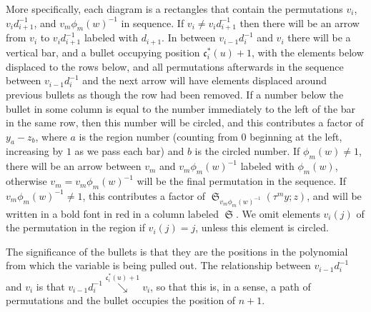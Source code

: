 \documentclass[reqno]{amsart}
\theoremstyle{definition}
\theoremstyle{remark}
\numberwithin{equation}{subsection}
\DeclareMathOperator{\sch}{\mathfrak{S}}
\newcommand{\downvar}[1]{\stackrel{#1}{\searrow}}
\newcommand{\shifthom}{\tau}
\newcommand{\shiftvby}[1]{\shifthom^{#1}}
\newcommand{\code}{\mathfrak{c}}
\begin{document}
 More specifically, each diagram is a rectangles that contain the permutations $v_i$, $v_id_{i+1}^{-1}$, and $v_m\phi_m(w)^{-1}$ in sequence. If $v_i\neq v_id_{i+1}^{-1}$ then there will be an arrow from $v_i$ to $v_id_{i+1}^{-1}$ labeled with $d_{i+1}$. In between $v_{i-1}d_i^{-1}$ and $v_i$ there will be a vertical bar, and a bullet occupying position $\code_i^*(u)+1$, with the elements below displaced to the rows below, and all permutations afterwards in the sequence between $v_{i-1}d_i^{-1}$ and the next arrow will have elements displaced around previous bullets as though the row had been removed. If a number below the bullet in some column is equal to the number immediately to the left of the bar in the same row, then this number will be circled, and this contributes a factor of $y_a-z_b$, where $a$ is the region number (counting from 0 beginning at the left, increasing by $1$ as we pass each bar) and $b$ is the circled number. If $\phi_m(w)\neq 1$, there will be an arrow between $v_m$ and $v_m\phi_m(w)^{-1}$ labeled with $\phi_m(w)$, otherwise $v_m=v_m\phi_m(w)^{-1}$ will be the final permutation in the sequence. If $v_m\phi_m(w)^{-1}\neq 1$, this contributes a factor of $\sch_{v_m\phi_m(w)^{-1}}(\shiftvby{m}y;z)$, and will be written in a bold font in red in a column labeled $\sch$. We omit elements $v_i(j)$ of the permutation in the region if $v_i(j)=j$, unless this element is circled.

The significance of the bullets is that they are the positions in the polynomial from which the variable is being pulled out. The relationship between $v_{i-1}d_i^{-1}$ and $v_i$ is that $v_{i-1}d_i^{-1}\downvar{\code_i^*(u)+1}v_i$, so that this is, in a sense, a path of permutations and the bullet occupies the position of $n+1$.
\end{document}
